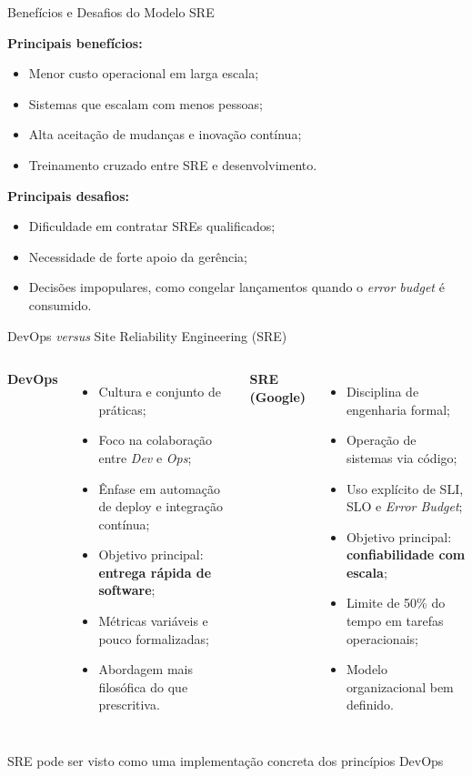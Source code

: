 \documentclass[9pt]{beamer}
\begin{document}
\begin{frame}{Benefícios e Desafios do Modelo SRE}

\textbf{Principais benefícios:}
\begin{itemize}
  \item Menor custo operacional em larga escala;
  \item Sistemas que escalam com menos pessoas;
  \item Alta aceitação de mudanças e inovação contínua;
  \item Treinamento cruzado entre SRE e desenvolvimento.
\end{itemize}
 
\medskip
\textbf{Principais desafios:}
\begin{itemize}
  \item Dificuldade em contratar SREs qualificados;
  \item Necessidade de forte apoio da gerência;
  \item Decisões impopulares, como congelar lançamentos
  quando o \textit{error budget} é consumido.
\end{itemize}

\end{frame}
\begin{frame}{DevOps \textit{versus} Site Reliability Engineering (SRE)}

\begin{columns}[T]
    \textbf{DevOps}
    \begin{itemize}
        \item Cultura e conjunto de práticas;
        \item Foco na colaboração entre \textit{Dev} e \textit{Ops};
        \item Ênfase em automação de deploy e integração contínua;
        \item Objetivo principal: \textbf{entrega rápida de software};
        \item Métricas variáveis e pouco formalizadas;
        \item Abordagem mais filosófica do que prescritiva.
    \end{itemize}

    \textbf{SRE (Google)}
    \begin{itemize}
        \item Disciplina de engenharia formal;
        \item Operação de sistemas via código;
        \item Uso explícito de SLI, SLO e \textit{Error Budget};
        \item Objetivo principal: \textbf{confiabilidade com escala};
        \item Limite de 50\% do tempo em tarefas operacionais;
        \item Modelo organizacional bem definido.
    \end{itemize}
\end{columns}

\vspace{0.3cm}
\centering
{\scriptsize SRE pode ser visto como uma implementação concreta dos princípios DevOps}

\end{frame}
\end{document}
